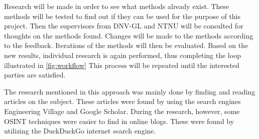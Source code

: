 Research will be made in order to see what methods already exist. These methods will be tested to find out if they can be used for the purpose of this project. Then the supervisors from DNV-GL and NTNU will be consulted for thoughts on the methods found. Changes will be made to the methods according to the feedback. Iterations of the methods will then be evaluated. Based on the new results, individual research is again performed, thus completing the loop illustrated in \cref{fig:workflow} This process will be repeated until the interested parties are satisfied. 

The research mentioned in this approach was mainly done by finding and reading articles on the subject. These articles were found by using the search engines Engineering Village\cite{engineering_village} and Google Scholar\cite{google_scholar}. During the research, however, some OSINT techniques were easier to find in online blogs. These were found by utilizing the DuckDuckGo internet search engine\cite{ddg}. 


 
